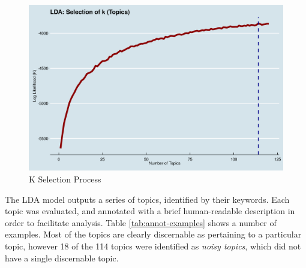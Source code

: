 \documentclass[11pt,journal,final,a4paper]{IEEEtran}
\begin{document}
\begin{figure}[!ht]
\centerline{\includegraphics[scale=0.4]{img/topic_model_01_idealk.png}}
\caption{K Selection Process}
\label{fig7}
\end{figure}

The LDA model outputs a series of topics, identified by their keywords. Each topic was evaluated, and annotated with a brief human-readable description in order to facilitate analysis. Table \ref{tab:annot-examples} shows a number of examples. Most of the topics are clearly discernable as pertaining to a particular topic, however 18 of the 114 topics were identified as \textit{noisy topics}, which did not have a single discernable topic.
\end{document}
